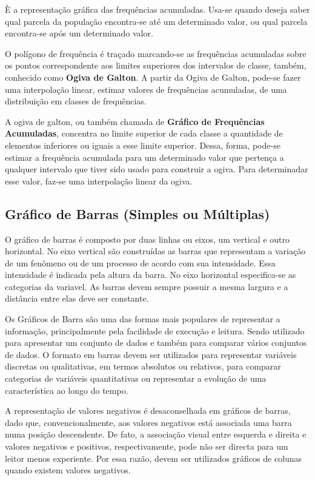 È a representação gráfica das frequências acumuladas. Usa-se
quando deseja saber qual parcela da população encontra-se até um
determinado valor, ou qual parcela encontra-se após um determinado
valor.\vskip0.3cm

O polígono de frequência é traçado marcando-se as frequências
acumuladas sobre os pontos correspondente aos limites superiores
dos intervalos de classe, também, conhecido como \textbf{Ogiva de
Galton}. A partir da Ogiva de Galton, pode-se fazer uma
interpolação linear, estimar valores de frequências acumuladas, de
uma distribuição em classes de frequências.\vskip0.3cm

A ogiva de galton, ou também chamada de \textbf{Gráfico de
Frequências Acumuladas}, concentra no limite superior de cada
classe a quantidade de elementos inferiores ou iguais a esse
limite superior. Dessa, forma, pode-se estimar a frequência
acumulada para um determinado valor que pertença a qualquer
intervalo que tiver sido usado para construir a ogiva. Para
determinadar esse valor, faz-se uma interpolação linear da ogiva.


\subsection{Gráfico de Barras (Simples ou Múltiplas)}

\inic O gráfico de barras é composto por duas linhas ou eixos, um
vertical e outro horizontal. No eixo vertical são construídas as
barras que representam a variação de um fenômeno ou de um processo
de acordo com sua intensidade. Essa intensidade é indicada pela
altura da barra. No eixo horizontal especifica-se as categorias da
variavel. As barras devem sempre possuir a mesma largura e a
distância entre elas deve ser constante.\vskip0.3cm

Os Gráficos de Barra são uma das formas mais populares de representar a informação, principalmente pela facilidade de execução e leitura. Sendo utilizado para apresentar um conjunto de dados e também para comparar vários conjuntos de dados. O formato em barras devem ser utilizados para representar variáveis discretas ou qualitativas, em termos absolutos ou relativos, para comparar categorias de variáveis quantitativas ou representar a evolução de uma característica ao longo do tempo.\vskip0.3cm

A representação de valores negativos é desaconselhada em gráficos de barras, dado que, convencionalmente, aos valores negativos está associada uma barra numa posição descendente. De fato, a associação visual entre esquerda e direita e valores negativos e positivos, respectivamente, pode não ser directa para um leitor menos experiente. Por essa razão, devem ser utilizados gráficos de colunas quando existem valores negativos.\vskip0.3cm

